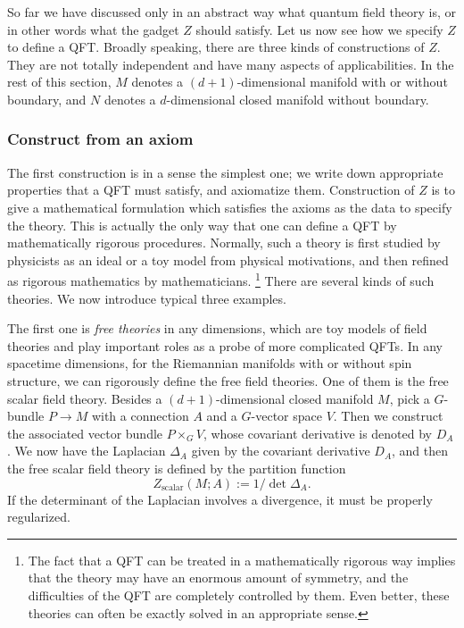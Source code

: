 So far we have discussed only in an abstract way what quantum field
theory is, or in other words what the gadget $Z$ should satisfy.
Let us now see how we specify $Z$ to define a QFT. Broadly speaking,
there are three kinds of constructions of $Z$. They are not totally
independent and have many aspects of applicabilities. In the rest
of this section, $M$ denotes a $(d+1)$-dimensional manifold with
or without boundary, and $N$ denotes a $d$-dimensional closed manifold
without boundary.

\subsubsection*{Construct from an axiom}

The first construction is in a sense the simplest one; we write down
appropriate properties that a QFT must satisfy, and axiomatize them.
Construction of $Z$ is to give a mathematical formulation which satisfies
the axioms as the data to specify the theory. This is actually the
only way that one can define a QFT by mathematically rigorous procedures.
Normally, such a theory is first studied by physicists as an ideal
or a toy model from physical motivations, and then refined as rigorous
mathematics by mathematicians.%
%
\footnote{The fact that a QFT can be treated in a mathematically rigorous way
implies that the theory may have an enormous amount of symmetry, and
the difficulties of the QFT are completely controlled by them. Even
better, these theories can often be exactly solved in an appropriate
sense.}
%
There are several kinds of such theories. We now introduce typical
three examples.

The first one is \emph{free theories} in any dimensions, which are
toy models of field theories and play important roles as a probe of
more complicated QFTs. In any spacetime dimensions, for the Riemannian
manifolds with or without spin structure, we can rigorously define
the free field theories. One of them is the free scalar field theory.
Besides a $(d+1)$-dimensional closed manifold $M$, pick a $G$-bundle
$P\to M$ with a connection $A$ and a $G$-vector space $V$.
Then we construct the associated vector bundle $P\times_{G}V$, whose
covariant derivative is denoted by $D_{A}$. We now have the Laplacian
$\Delta_{A}$ given by the covariant derivative $D_{A}$, and then
the free scalar field theory is defined by the partition function
\begin{equation}
  Z_{\mathrm{scalar}}(M;A)  :=  1/\det\Delta_{A}.
\end{equation}
If the determinant of the Laplacian involves a divergence, it must
be properly regularized.

